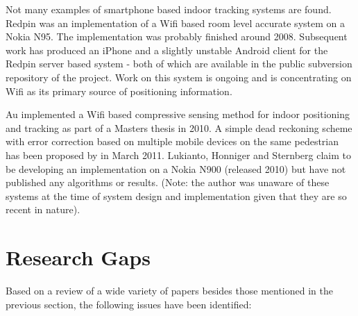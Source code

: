 Not many examples of smartphone based indoor tracking systems are found. Redpin\cite{Redpin} was an implementation of a Wifi based room level accurate system on a Nokia N95. The implementation was probably finished around 2008. Subsequent work has produced an iPhone and a slightly unstable Android client for the Redpin server based system - both of which are available in the public subversion repository of the project. Work on this system is ongoing and is concentrating on Wifi as its primary source of positioning information.

Au \cite{Anthea} implemented a Wifi based compressive sensing method for indoor positioning and tracking as part of a Masters thesis in 2010. A simple dead reckoning scheme with error correction based on multiple mobile devices on the same pedestrian has been proposed by \cite{NUSJin} in March 2011. Lukianto, Honniger and Sternberg\cite{Lukianto} claim to be developing an implementation on a Nokia N900 (released 2010) but have not published any algorithms or results. (Note: the author was unaware of these systems at the time of system design and implementation given that they are so recent in nature).


\section{Research Gaps}

Based on a review of a wide variety of papers besides those mentioned in the previous section, the following issues have been identified:

